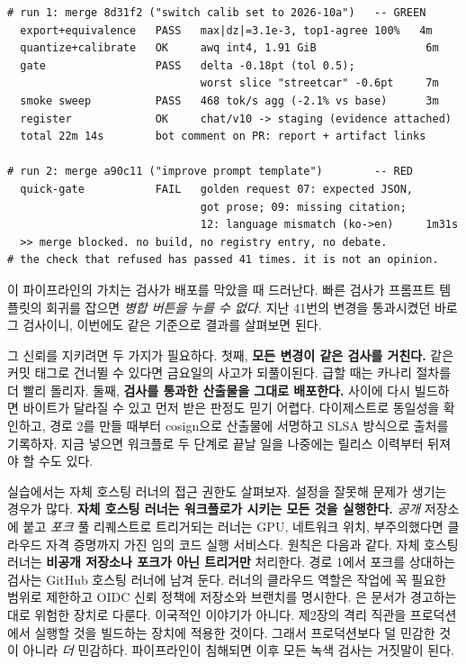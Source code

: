 \begin{terminalbox}
\begin{Verbatim}[breaklines=true,breakanywhere=true,fontsize=\small,formatcom=\color{tbbtermfg},codes=\tbbcodeactive]
# run 1: merge 8d31f2 ("switch calib set to 2026-10a")   -- GREEN
  export+equivalence   PASS   max|dz|=3.1e-3, top1-agree 100%   4m
  quantize+calibrate   OK     awq int4, 1.91 GiB                 6m
  gate                 PASS   delta -0.18pt (tol 0.5);
                              worst slice "streetcar" -0.6pt     7m
  smoke sweep          PASS   468 tok/s agg (-2.1% vs base)      3m
  register             OK     chat/v10 -> staging (evidence attached)
  total 22m 14s        bot comment on PR: report + artifact links

# run 2: merge a90c11 ("improve prompt template")        -- RED
  quick-gate           FAIL   golden request 07: expected JSON,
                              got prose; 09: missing citation;
                              12: language mismatch (ko->en)     1m31s
  >> merge blocked. no build, no registry entry, no debate.
# the check that refused has passed 41 times. it is not an opinion.
\end{Verbatim}
\end{terminalbox}

이 파이프라인의 가치는 검사가 배포를 막았을 때 드러난다. 빠른 검사가 프롬프트 템플릿의 회귀를 잡으면 \textit{병합 버튼을 누를 수 없다.} 지난 41번의 변경을 통과시켰던 바로 그 검사이니, 이번에도 같은 기준으로 결과를 살펴보면 된다.

그 신뢰를 지키려면 두 가지가 필요하다. 첫째, \textbf{모든 변경이 같은 검사를 거친다.}  같은 커밋 태그로 건너뛸 수 있다면 금요일의 사고가 되풀이된다. 급할 때는 카나리 절차를 더 빨리 돌리자. 둘째, \textbf{검사를 통과한 산출물을 그대로 배포한다.} 사이에 다시 빌드하면 바이트가 달라질 수 있고 먼저 받은 판정도 믿기 어렵다. 다이제스트로 동일성을 확인하고, 경로 2를 만들 때부터 cosign으로 산출물에 서명하고 SLSA 방식으로 출처를 기록하자. 지금 넣으면 워크플로 두 단계로 끝날 일을 나중에는 릴리스 이력부터 뒤져야 할 수도 있다.

실습에서는 자체 호스팅 러너의 접근 권한도 살펴보자. 설정을 잘못해 문제가 생기는 경우가 많다. \textbf{자체 호스팅 러너는 워크플로가 시키는 모든 것을 실행한다.} \textit{공개} 저장소에 붙고 \textit{포크} 풀 리퀘스트로 트리거되는 러너는 GPU, 네트워크 위치, 부주의했다면 클라우드 자격 증명까지 가진 임의 코드 실행 서비스다. 원칙은 다음과 같다. 자체 호스팅 러너는 \textbf{비공개 저장소나 포크가 아닌 트리거만} 처리한다. 경로 1에서 포크를 상대하는 검사는 GitHub 호스팅 러너에 남겨 둔다. 러너의 클라우드 역할은 작업에 꼭 필요한 범위로 제한하고 OIDC 신뢰 정책에 저장소와 브랜치를 명시한다. 은 문서가 경고하는 대로 위험한 장치로 다룬다. 이국적인 이야기가 아니다. 제2장의 격리 직관을 프로덕션에서 실행할 것을 빌드하는 장치에 적용한 것이다. 그래서 프로덕션보다 덜 민감한 것이 아니라 \textit{더} 민감하다. 파이프라인이 침해되면 이후 모든 녹색 검사는 거짓말이 된다.

